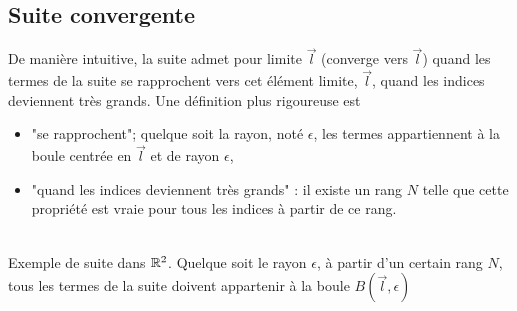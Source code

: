 \documentclass{book}
\begin{document}
\subsection{Suite convergente}
De manière intuitive, la suite admet pour limite $\vec{l}$ (converge vers $\vec{l}$) quand les termes de la suite se rapprochent  vers cet élément limite, $\vec{l}$,  quand les indices deviennent très grands. Une définition plus rigoureuse est 
\begin{itemize}  
\item "se rapprochent"; quelque soit la rayon, noté $\epsilon$, les termes appartiennent à la boule centrée en $\vec{l}$ et de rayon $\epsilon$,
\item  "quand les indices deviennent très grands" : il existe un rang $N$ telle que cette propriété est vraie pour tous les indices à partir de ce rang. 
\end{itemize} 
\begin{center}
\\
Exemple de suite dans $\mathbb{R}^2$. Quelque soit le rayon $\epsilon$, à partir d'un certain rang $N$, tous les termes de la suite doivent appartenir à la boule $B(\vec{l},\epsilon)$
\end{center}
\end{document}
